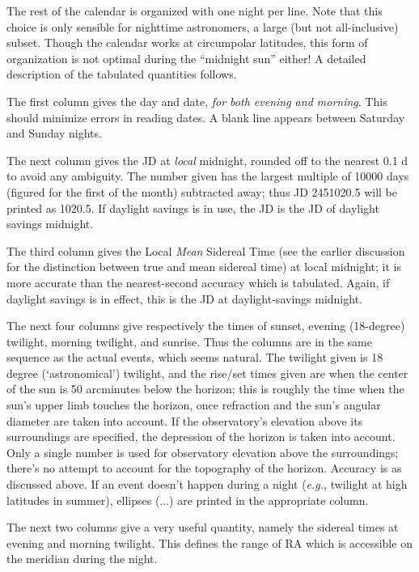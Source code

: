The rest of the calendar is organized with one night per line.
Note that this choice is only sensible for nighttime astronomers,
a large (but not all-inclusive) subset.  Though the calendar works
at circumpolar latitudes, this form of organization is not optimal
during the ``midnight sun'' either!  A detailed description of the
tabulated quantities follows.

The first column gives the day and date, {\it for both evening and morning}.
This should minimize errors in reading dates.  A blank line 
appears between Saturday and Sunday nights.

The next column gives the JD at {\it local} midnight, rounded off to
the nearest 0.1 d to avoid any ambiguity.  The number given has
the largest multiple of 10000 days (figured for the first of the
month) subtracted away; thus JD 2451020.5 will be printed as 1020.5.
If daylight savings 
is in use, the JD is the JD of daylight savings midnight.

The third column gives the Local {\it Mean} Sidereal Time (see
the earlier discussion for the distinction between true and
mean sidereal time) at local
midnight; it is more accurate
than the nearest-second accuracy which is tabulated.  Again, 
if daylight savings is in effect, this is the JD at daylight-savings
midnight.

The next four columns give respectively the times of sunset,
evening (18-degree) twilight, morning twilight, and sunrise.  Thus the columns 
are in the same sequence as the actual events, which seems
natural.
The twilight given is 18 degree (`astronomical') twilight, 
and the rise/set times given are when the center of the sun 
is 50 arcminutes below the horizon; this is roughly the time 
when the sun's upper limb touches the horizon, once refraction
and the sun's angular diameter are taken into account.  If the
observatory's elevation above its surroundings are specified, 
the depression of the horizon is taken into account.  Only 
a single number is used for observatory elevation above the
surroundings; there's no attempt to account for the topography
of the horizon.  Accuracy
is as discussed above.  If an event doesn't happen during a night
({\it e.g.}, twilight at high latitudes in summer), ellipses ($\ldots$)
are printed in the appropriate column.  

The next two columns give a very useful quantity, namely
the sidereal times at evening and morning twilight.  This defines
the range of RA which is accessible on the meridian during the night.

